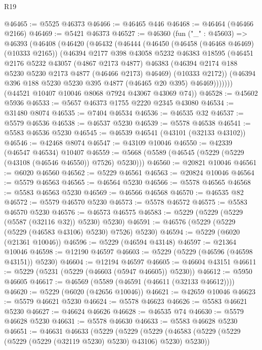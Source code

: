 \begin{lexlean}{R19}
\begin{coremodule}
@46465 := @5525 @46373
@46466 := @46465 @446
@46468 := @46464 (@46466 @2166)
@46469 := @5421 @46373
@46527 := @46360
    (fun ("_" : @45603) =>
    @46393
      (@46408
        (@46420
          (@46432
            (@46444
              (@46450
                (@46458 (@46468 @46469) (@10333 @2165))
                (@46394
                  @2177
                  @398
                  @43058
                  @5232
                  @46383
                  @18595
                  (@46451
                    @2176
                    @5232
                    @43057
                    (@4867 @2173 @4877)
                    @46383
                    (@46394 @2174 @188 @5230 @5230 @2173 @4877 (@46466 @2173) @46469)
                    (@10333 @2172))
                  (@46394 @396 @188 @5230 @5230 @395 @4877 (@46465 @20 @395) @46469)))))))
      (@44521 @10407 @10046 @8068 @7924 @43067 @43069 @74))
@46528 := @45602 @5936
@46533 := @5657 @46373 @1755 @2220 @2345 @43080
@46534 := @31480 @8074
@46535 := @7404 @46534
@46536 := @46535 @32
@46537 := @5579 @46536
@46538 := @46537 @5230
@46539 := @5578 @46538
@46541 := @5583 @46536 @5230
@46545 := @46539 @46541 (@43101 (@32133 @43102))
@46546 := @42468 @8074
@46547 := @43109 @10046
@46550 := @42339 (@46547 @46534) @10407
@46559 := @5668 (@5589 (@46545 (@5229 (@5229 (@43108 (@46546 @46550)) @7526) @5230)))
@46560 := @20821 @10046
@46561 := @6020 @46560
@46562 := @5229 @46561
@46563 := @20824 @10046
@46564 := @5579 @46563
@46565 := @46564 @5230
@46566 := @5578 @46565
@46568 := @5583 @46563 @5230
@46569 := @46566 @46568
@46570 := @46535 @82
@46572 := @5579 @46570 @5230
@46573 := @5578 @46572
@46575 := @5583 @46570 @5230
@46576 := @46573 @46575
@46583 := @5229 (@5229 (@5229 (@5587 (@32116 @32)) @5230) @5230)
@46591 := @46576 (@5229 (@5229 (@5229 (@46583 @43106) @5230) @7526) @5230)
@46594 := @5229 (@6020 (@21361 @10046))
@46596 := @5229 (@46594 @43148)
@46597 := @21364 @10046
@46598 := @12190 @46597
@46603 := @5229 (@5229 (@46596 (@46598 @43151)) @5230)
@46604 := @12194 @46597
@46605 := @46604 @43151
@46611 := @5229 (@5231 (@5229 (@46603 (@5947 @46605)) @5230))
@46612 := @5950 @46605
@46617 := @46569 (@5589 (@46591 (@46611 (@32133 @46612))))
@46620 := @5229 (@6020 (@42656 @10046))
@46621 := @42659 @10046
@46623 := @5579 @46621 @5230
@46624 := @5578 @46623
@46626 := @5583 @46621 @5230
@46627 := @46624 @46626
@46628 := @46535 @74
@46630 := @5579 @46628 @5230
@46631 := @5578 @46630
@46633 := @5583 @46628 @5230
@46651 := @46631
    @46633
    (@5229
      (@5229
        (@5229
          (@46583 (@5229 (@5229 (@5229 (@5229 (@32119 @5230) @5230) @43106) @5230) @5230))

\end{coremodule}
\end{lexlean}
